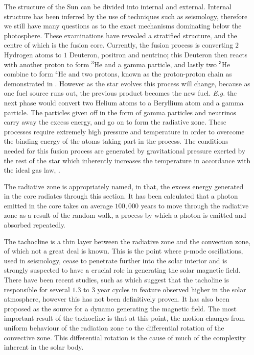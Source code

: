 The structure of the Sun can be divided into internal and external.
Internal structure has been inferred by the use of techniques such as seismology, therefore we still have many questions as to the exact mechanisms dominating below the photosphere.
These examinations have revealed a stratified structure, and the centre of which is the fusion core.
Currently, the fusion process is converting $2$ Hydrogen atoms to $1$ Deuteron, positron and neutrino; this Deuteron then reacts with another proton to form ${^3}$He and a gamma particle, and lastly two $^{3}$He combine to form $^{4}$He and two protons, known as the proton-proton chain as demonstrated in \cite{Bethe1939}. 
However as the star evolves this process will change, because as one fuel source runs out, the previous product becomes the new fuel.
\emph{E.g.} the next phase would convert two Helium atoms to a Beryllium atom and a gamma particle.
The particles given off in the form of gamma particles and neutrinos carry away the excess energy, and go on to form the radiative zone.
These processes require extremely high pressure and temperature in order to overcome the binding energy of the atoms taking part in the process.
The conditions needed for this fusion process are generated by gravitational pressure exerted by the rest of the star which inherently increases the temperature in accordance with the ideal gas law, \citep{Larson2003}.

The radiative zone is appropriately named, in that, the excess energy generated in the core radiates through this section.
It has been calculated that a photon emitted in the core takes on average $100,000$ years to move through the radiative zone as a result of the random walk, a process by which a photon is emitted and absorbed repeatedly.

The tachocline is a thin layer between the radiative zone and the convection zone, of which not a great deal is known.
This is the point where p-mode oscillations, used in seismology, cease to penetrate further into the solar interior and is strongly suspected to have a crucial role in generating the solar magnetic field.
There have been recent studies, such as \cite{Obridko2007} which suggest that the tacholine is responsible for several $1.3$ to $3$ year cycles in feature observed higher in the solar atmosphere, however this has not been definitively proven.
It has also been proposed as the source for a dynamo generating the magnetic field.
The most important result of the tachocline is that at this point, the motion changes from uniform behaviour of the radiation zone to the differential rotation of the convective zone.
This differential rotation is the cause of much of the complexity inherent in the solar body.

